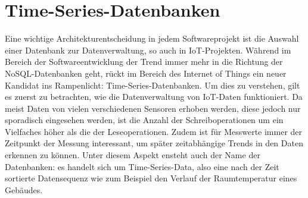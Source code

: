 
\section{Time-Series-Datenbanken}
\label{sec:Prot:timeseriesdb}

Eine wichtige Architekturentscheidung in jedem Softwareprojekt ist die Auswahl einer Datenbank zur Datenverwaltung, so auch in IoT-Projekten. Während im Bereich der Softwareentwicklung der Trend immer mehr in die Richtung der NoSQL-Datenbanken geht, rückt im Bereich des Internet of Things ein neuer Kandidat ins Rampenlicht: Time-Series-Datenbanken. Um dies zu verstehen, gilt es zuerst zu betrachten, wie die Datenverwaltung von IoT-Daten funktioniert. Da meist Daten von vielen verschiedenen Sensoren erhoben werden, diese jedoch nur sporadisch eingesehen werden, ist die Anzahl der Schreiboperationen um ein Vielfaches höher als die der Leseoperationen. Zudem ist für Messwerte immer der Zeitpunkt der Messung interessant, um später zeitabhängige Trends in den Daten erkennen zu können. Unter diesem Aspekt ensteht auch der Name der Datenbanken: es handelt sich um Time-Series-Data, also eine nach der Zeit sortierte Datensequenz wie zum Beispiel den Verlauf der Raumtemperatur eines Gebäudes. 

